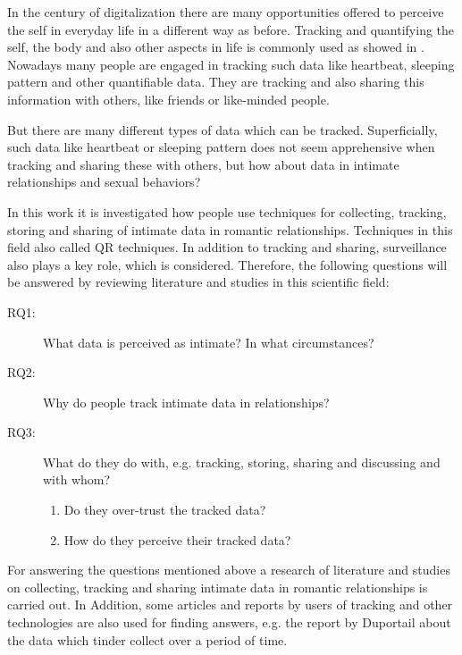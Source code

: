 \label{sec:introduction}

In the century of digitalization there are many opportunities offered to perceive the self in everyday life in a different way as before. Tracking and quantifying the self, the body and also other aspects in life is commonly used as showed in \cite{kelly2017inevitable}. Nowadays many people are engaged in tracking such data like heartbeat, sleeping pattern and other quantifiable data. They are tracking and also sharing this information with others, like friends or like-minded people. 



But there are many different types of data which can be tracked. Superficially, such data like heartbeat or sleeping pattern does not seem apprehensive when tracking and sharing these with others, but how about data in intimate relationships and sexual behaviors?


In this work it is investigated how people use techniques for collecting, tracking, storing and sharing of intimate data in romantic relationships. Techniques in this field also called \acl{QR} techniques. In addition to tracking and sharing, surveillance also plays a key role, which is considered.
Therefore, the following questions will be answered by reviewing literature and studies in this scientific field:
 \begin{description}
 	\item[RQ1:] What data is perceived as intimate? In what circumstances?
 	\item[RQ2:] Why do people track intimate data in relationships?
 	\item[RQ3:] What do they do with, e.g. tracking, storing, sharing and discussing and with whom?
 	\begin{enumerate}
 		\item Do they over-trust the tracked data?
 		\item How do they perceive their tracked data?
 	\end{enumerate}
 \end{description}
For answering the questions mentioned above a research of literature and studies on collecting, tracking and sharing intimate data in romantic relationships is carried out. In Addition, some articles and reports by users of tracking and other technologies are also used for finding answers, e.g. the report by Duportail \cite{Duportail2017} about the data which tinder collect over a period of time.

